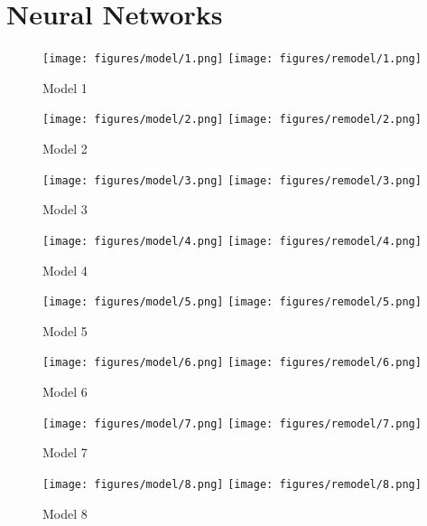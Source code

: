 \chapter{Neural Networks}
%
\begin{figure}[!h]
  \centering
  \texttt{[image: figures/model/1.png]}
  \texttt{[image: figures/remodel/1.png]}
  \caption{Model 1}
  \label{fig:model1}
\end{figure}

\begin{figure}
  \centering
  \texttt{[image: figures/model/2.png]}
  \texttt{[image: figures/remodel/2.png]}
  \caption{Model 2}
  \label{fig:model2}
\end{figure}

\begin{figure}
  \centering
  \texttt{[image: figures/model/3.png]}
  \texttt{[image: figures/remodel/3.png]}
  \caption{Model 3}
  \label{fig:model3}
\end{figure}

\begin{figure}
  \centering
  \texttt{[image: figures/model/4.png]}
  \texttt{[image: figures/remodel/4.png]}
  \caption{Model 4}
  \label{fig:model4}
\end{figure}

\begin{figure}
  \centering
  \texttt{[image: figures/model/5.png]}
  \texttt{[image: figures/remodel/5.png]}
  \caption{Model 5}
  \label{fig:model5}
\end{figure}

\begin{figure}
  \centering
  \texttt{[image: figures/model/6.png]}
  \texttt{[image: figures/remodel/6.png]}
  \caption{Model 6}
  \label{fig:model6}
\end{figure}

\begin{figure}
  \centering
  \texttt{[image: figures/model/7.png]}
  \texttt{[image: figures/remodel/7.png]}
  \caption{Model 7}
  \label{fig:model7}
\end{figure}

\begin{figure}
  \centering
  \texttt{[image: figures/model/8.png]}
  \texttt{[image: figures/remodel/8.png]}
  \caption{Model 8}
  \label{fig:model8}
\end{figure}

